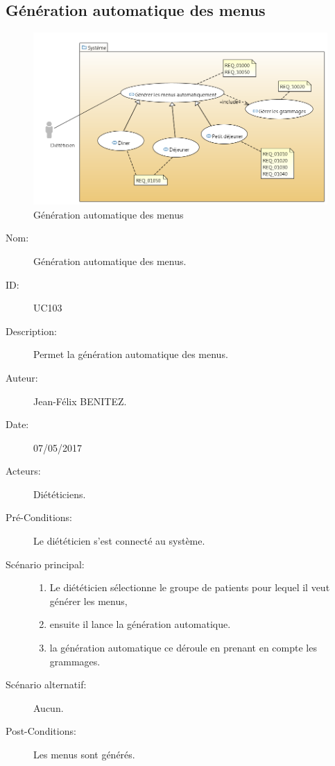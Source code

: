 \subsection{Génération automatique des menus}
\begin{figure}[H]
\label{MenuGen}
  \centering
      \includegraphics[width=1.00\textwidth]{../../CasDUtilisations/MenuGen/UseCase_Diagram} %
\caption{Génération automatique des menus}
\end{figure}

\begin{description}
\item[Nom:] Génération automatique des menus.
\item[ID:] UC103
\item[Description:] Permet la génération automatique des menus.
\item[Auteur:] Jean-Félix BENITEZ.
\item[Date:] 07/05/2017
\item[Acteurs:] Diététiciens.
\item[Pré-Conditions:] Le diététicien s'est connecté au système.
\item[Scénario principal:]
  \begin{enumerate}
  \item Le diététicien sélectionne le groupe de patients pour lequel il veut générer les menus,
  \item ensuite il lance la génération automatique.
  \item la génération automatique ce déroule en prenant en compte les grammages.
  \end{enumerate}
\item[Scénario alternatif:] Aucun.
\item[Post-Conditions:] Les menus sont générés.
\end{description}

